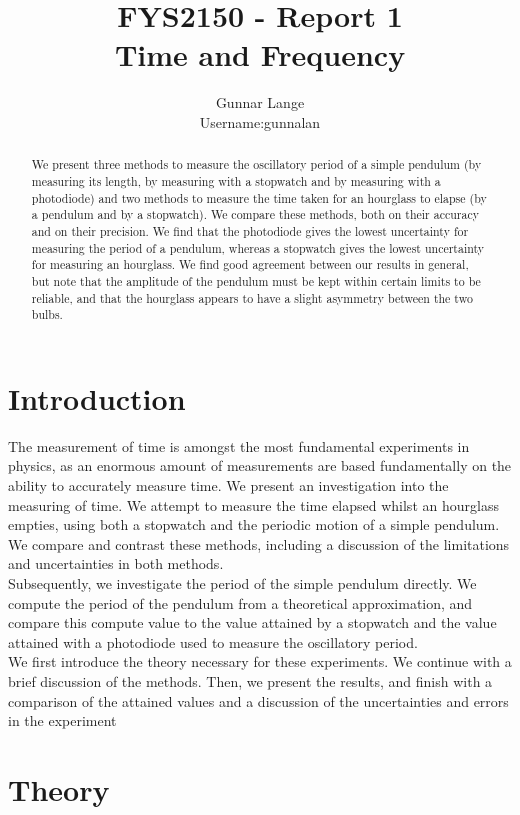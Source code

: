 \documentclass[a4paper, 10pt]{article}
\title{FYS2150 - Report 1\\
Time and Frequency}
\author{Gunnar Lange\\ Username:gunnalan}
\date{}
\begin{document}
\maketitle
\begin{abstract}
\begin{center}
We present three methods to measure the oscillatory period of a simple pendulum (by measuring its length, by measuring with a stopwatch and by measuring with a photodiode) and two methods to measure the time taken for an hourglass to  elapse (by a pendulum and by a stopwatch). We compare these methods, both on their accuracy and on their precision. We find that the photodiode gives the lowest uncertainty for measuring the period of a pendulum, whereas a stopwatch gives the lowest uncertainty for measuring an hourglass. We find good agreement between our results in general, but note that the amplitude of the pendulum must be kept within certain limits to be reliable, and that the hourglass appears to have a slight asymmetry between the two bulbs.
\end{center}
\end{abstract}
\section{Introduction}
The measurement of time is amongst the most fundamental experiments in physics, as an enormous amount of measurements are based fundamentally on the ability to accurately measure time. We present an investigation into the measuring of time. We attempt to measure the time elapsed whilst an hourglass empties, using both a stopwatch and the periodic motion of a simple pendulum. We compare and contrast these methods, including a discussion of the limitations and uncertainties in both methods.\\
\linebreak
Subsequently, we investigate the period of the simple pendulum directly. We compute the period of the pendulum from a theoretical approximation, and compare this compute value to the value attained by a stopwatch and the value attained with a photodiode used to measure the oscillatory period.\\
\linebreak
We first introduce the theory necessary for these experiments. We continue with a brief discussion of the methods. Then, we present the results, and finish with a comparison of the attained values and a discussion of the uncertainties and errors in the experiment
\section{Theory}
\end{document}
